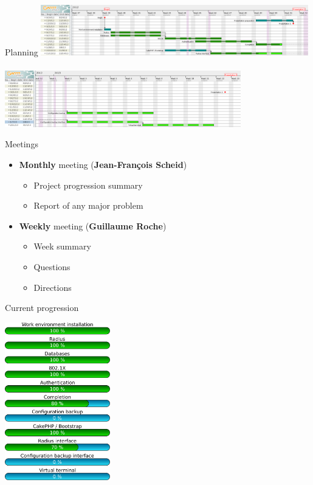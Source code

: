 \documentclass[12pt]{beamer}
\begin{document}
\begin{frame}{Planning}
	\includegraphics[width=330pt]{img/gantt_en_part1.pdf}\\
~\\
	\includegraphics[height=70pt]{img/gantt_en_part2.pdf}
\end{frame}

\begin{frame}{Meetings}
\begin{itemize}
    \item \textbf{Monthly} meeting (\textbf{Jean-François Scheid})
	\vspace{0.2cm}
	\begin{itemize}
	\item Project progression summary
	\item Report of any major problem
	\end{itemize}
	\vspace{0.8cm}\pause
    \item \textbf{Weekly} meeting (\textbf{Guillaume Roche})
	\vspace{0.2cm}
	\begin{itemize}
	\item Week summary
	\item Questions
	\item Directions
	\end{itemize}
    \end{itemize}
\end{frame}

\begin{frame}{Current progression}
    \begin{center}
         \includegraphics[width=130pt]{img/progress.pdf}
    \end{center}
\end{frame}
\end{document}
